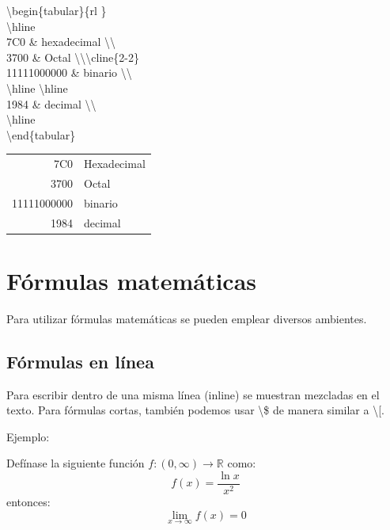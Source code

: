 \documentclass{article}
\begin{document}
\begin{multicols}{2}
\noindent
\textbackslash begin\{tabular\}\{\textbar \hspace*{1mm}r\hspace{1mm}\textbar\hspace{1mm}l\hspace*{1mm} \textbar\}\\
\textbackslash hline\\
7C0 \& hexadecimal \textbackslash \textbackslash \\
3700 \& Octal \textbackslash \textbackslash \quad \textbackslash cline\{2-2\}\\
11111000000 \& binario \textbackslash \textbackslash \\
\textbackslash hline \textbackslash hline\\
1984 \& decimal \textbackslash \textbackslash \\
\textbackslash hline\\
\textbackslash end\{tabular\}\\

\columnbreak

\begin{tabular}{| r | l |}
\hline
7C0	& Hexadecimal \\
3700 & Octal \\ \cline{2-2}
11111000000 & binario \\
\hline	\hline
1984 & decimal \\
\hline
\end{tabular}
\end{multicols}


\section{F\'ormulas matem\'aticas}

Para utilizar f\'ormulas matem\'aticas se pueden emplear diversos ambientes.

\subsection{F\'ormulas en l\'inea}
Para escribir dentro de una misma l\'inea (inline) se muestran mezcladas en el texto.
Para f\'ormulas cortas, tambi\'en podemos usar \textbackslash \$ de manera similar a \textbackslash [.

Ejemplo:

Def\'inase la siguiente funci\'on
$f:(0,\infty)\to\mathbb{R}$
como:
\[
f(x)=\frac{\ln x}{x^2}
\]
entonces:
$$\lim_{x\to\infty}f(x)=0$$
\end{document}

